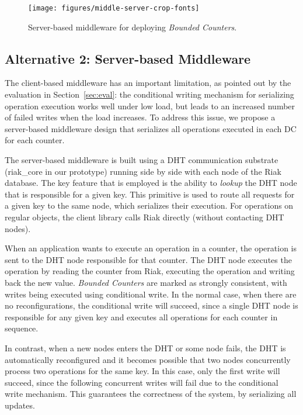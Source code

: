 \documentclass[conference]{IEEEtran}
\newcommand{\InvCounters}{\emph{Bounded Counters}}
\begin{document}
\begin{figure}
\texttt{[image: figures/middle-server-crop-fonts]}
\vspace{-2ex}
\caption{Server-based middleware for deploying \InvCounters{}.}\label{fig:middle-server}
\vspace{-2ex}
\end{figure}

\subsection{Alternative 2: Server-based Middleware}\label{sec:deploy:srvmid}

The client-based middleware has an important limitation, as pointed out by the evaluation in Section~\ref{sec:eval}: 
the conditional writing mechanism for serializing operation execution works well under low load, 
but leads to an increased number of failed writes when the load increases. 
To address this issue, we propose a server-based middleware design that serializes
all operations executed in each DC for each counter.

The server-based middleware is built using a DHT communication substrate 
(riak\_core \cite{riakcore} in our prototype) running side by side with each
node of the Riak database. The key feature 
that is employed is the ability to {\em lookup} the DHT node that is 
responsible for a given key. 
This primitive is used to route all requests for a given key to the same node,
which serializes their execution.
For operations on regular objects, the client library calls Riak directly 
(without contacting DHT nodes). 

When an application wants to execute an operation in a counter, 
the operation is sent to the DHT node responsible for that counter. 
The DHT node executes the operation by reading the counter from Riak, executing
the operation and writing back the new value. \InvCounters{} are
marked as strongly consistent, with writes being executed using conditional write.
In the normal case, when there are no reconfigurations, the conditional write 
will succeed, since a single DHT node is responsible for any given key 
and executes all operations for each counter in sequence.

In contrast, when a new nodes enters the DHT or some node fails, 
the DHT is automatically reconfigured and it
becomes possible that two nodes concurrently
process two operations for the same key.
In this case, only the first write will succeed, since the following concurrent
writes will fail due to the conditional write mechanism.
This guarantees the correctness of the system, by serializing all
updates.
\end{document}
